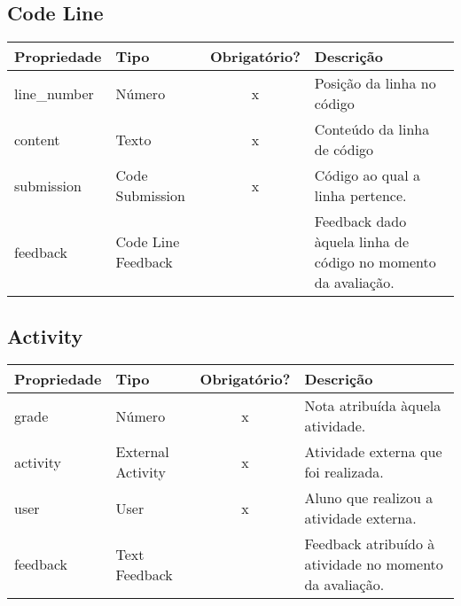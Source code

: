 \subsection{Code Line} \label{Code Line}
\begin{table}[H]
	\footnotesize
	\begin{tabularx}{\textwidth}{|X|X|c|p{7.8cm}|}   \hline \rowcolor[rgb]{0.8,0.8,0.8}
		
		\textbf{Propriedade} & \textbf{Tipo} & \textbf{Obrigatório?} & \centerline{\textbf{Descrição}} \\\hline  	
		
		line\_number & Número & x & Posição da linha no código \\\hline				
		content & Texto & x & Conteúdo da linha de código \\\hline	
		submission & Code Submission & x & Código ao qual a linha pertence. \\\hline
		feedback & Code Line Feedback & {} & Feedback dado àquela linha de código no momento da avaliação. \\\hline			
		
	\end{tabularx}	
\end{table}


\subsection{Activity} \label{Activity}
\begin{table}[H]
	\footnotesize
	\begin{tabularx}{\textwidth}{|X|X|c|p{7.8cm}|}   \hline \rowcolor[rgb]{0.8,0.8,0.8}
		
		\textbf{Propriedade} & \textbf{Tipo} & \textbf{Obrigatório?} & \centerline{\textbf{Descrição}} \\\hline  	
		
		grade & Número & x & Nota atribuída àquela atividade. \\\hline	
		activity & External Activity & x & Atividade externa que foi realizada. \\\hline			
		user & User & x & Aluno que realizou a atividade externa. \\\hline			
		feedback & Text Feedback & {} & Feedback atribuído à atividade no momento da avaliação. \\\hline			
		
	\end{tabularx}	
\end{table}
\newpage

